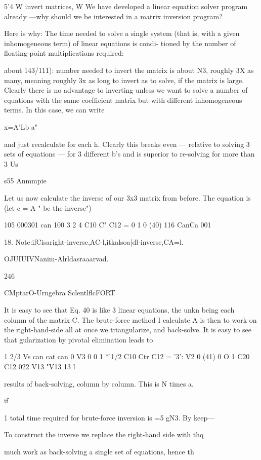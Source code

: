 {{{{{{{{5'4 W invert matrices, W
We have developed a linear equation solver program already
—why should we be interested in a matrix inversion program?

Here is why: The time needed to solve a single system (that is,
with a given inhomogeneous term) of linear equations is condi-
tioned by the number of floating-point multiplications required:

about 143/111): number needed to invert the matrix is about N3,
roughly 3X as many, meaning roughly 3x as long to invert as to
solve, if the matrix is large. Clearly there is no advantage to
inverting unless we want to solve a number of equations with the
same coefﬁcient matrix but with different inhomogeneous terms.
In this case, we can write

x=A'Lb a"

and just recalculate for each h. Clearly this breaks even — relative
to solving 3 sets of equations — for 3 different b's and is superior
to re-solving for more than 3 Us

s55 Anmmpie

Let us now calculate the inverse of our 3x3 matrix from before.
The equation is (let c = A " be the inverse")

105 000301 can 100
3 2 4 C10 C" C12 = 0 1 0 (40)
116 CanCa 001

 

18. Note:ifCisaright-inverse,AC-l,itkalsoa|dl-inverse,CA=l.

OJUIUIVNanim-Alrldasraaarvad.

246

CMptarO-Urngebra SclentlflcFORT

It is easy to see that Eq. 40 is like 3 linear equations, the unkn
being each column of the matrix C. The brute-force method I
calculate A is then to work on the right-hand-side all at once
we triangularize, and back-solve. It is easy to see that
gularization by pivotal elimination leads to

1 2/3 Vs can cat can 0 V3 0
0 1 *'1/2 C10 Ctr C12 = '3': V2 0 (41)
0 O 1 C20 C12 022 V13 "V13  13 l

results of back-solving, column by column. This is N times a.

if

1
total time required for brute-force inversion is =5 gN3. By keep—

To construct the inverse we replace the right-hand side with thq

much work as back-solving a single set of equations, hence th

}}}}}}}}
